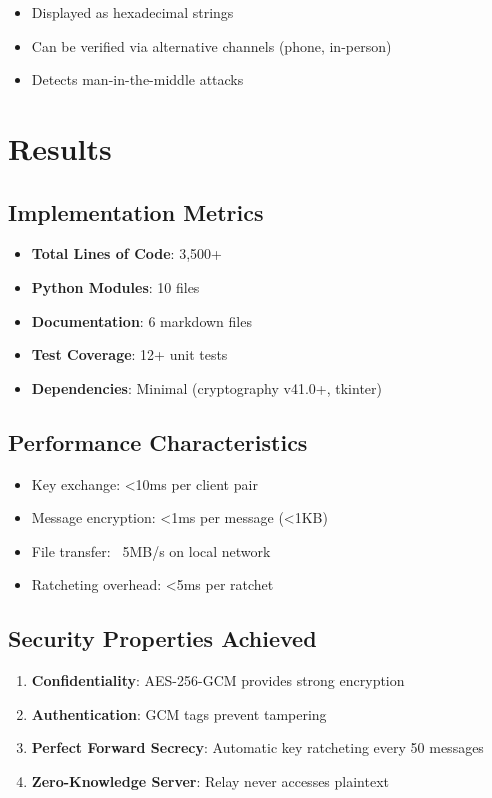 \documentclass[conference]{IEEEtran}
\begin{document}
\begin{itemize}
    \item Displayed as hexadecimal strings
    \item Can be verified via alternative channels (phone, in-person)
    \item Detects man-in-the-middle attacks
\end{itemize}

\section{Results}

\subsection{Implementation Metrics}

\begin{itemize}
    \item \textbf{Total Lines of Code}: 3,500+
    \item \textbf{Python Modules}: 10 files
    \item \textbf{Documentation}: 6 markdown files
    \item \textbf{Test Coverage}: 12+ unit tests
    \item \textbf{Dependencies}: Minimal (cryptography v41.0+, tkinter)
\end{itemize}

\subsection{Performance Characteristics}

\begin{itemize}
    \item Key exchange: <10ms per client pair
    \item Message encryption: <1ms per message (<1KB)
    \item File transfer: ~5MB/s on local network
    \item Ratcheting overhead: <5ms per ratchet
\end{itemize}

\subsection{Security Properties Achieved}

\begin{enumerate}
    \item \textbf{Confidentiality}: AES-256-GCM provides strong encryption
    \item \textbf{Authentication}: GCM tags prevent tampering
    \item \textbf{Perfect Forward Secrecy}: Automatic key ratcheting every 50 messages
    \item \textbf{Zero-Knowledge Server}: Relay never accesses plaintext
\end{enumerate}
\end{document}
